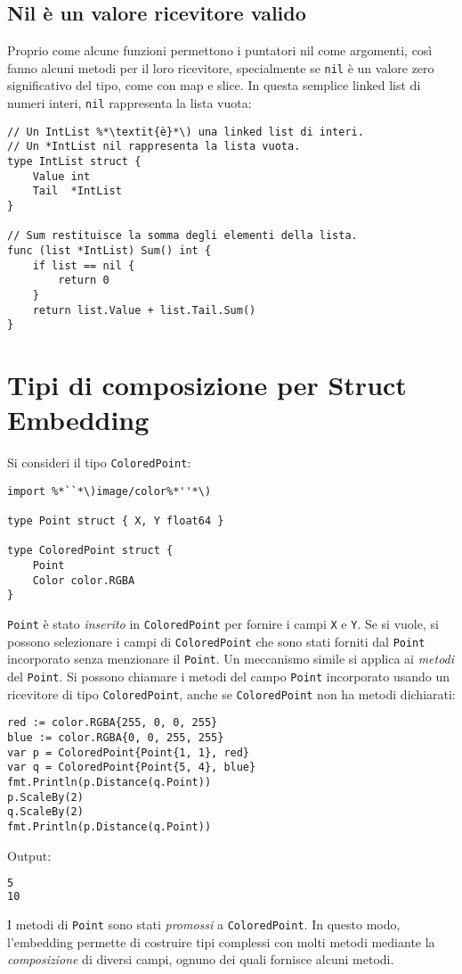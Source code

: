 \subsection{Nil è un valore ricevitore valido}
\label{subsec:nil_e_un_valore_ricevitore_valido}%
Proprio come alcune funzioni permettono i puntatori nil come argomenti, così fanno alcuni metodi per il loro ricevitore, specialmente se \verb|nil| è un valore zero significativo del tipo, come con map e slice.
In questa semplice linked list di numeri interi, \verb|nil| rappresenta la lista vuota:
\begin{lstlisting}[frame=single, label={lst:lstlisting5-2.8}]
// Un IntList %*\textit{è}*\) una linked list di interi.
// Un *IntList nil rappresenta la lista vuota.
type IntList struct {
    Value int
    Tail  *IntList
}

// Sum restituisce la somma degli elementi della lista.
func (list *IntList) Sum() int {
    if list == nil {
        return 0
    }
    return list.Value + list.Tail.Sum()
}
\end{lstlisting}


\section{Tipi di composizione per Struct Embedding}
\label{sec:tipi_di_composizione_per_struct_embedding}%
Si consideri il tipo \verb|ColoredPoint|:
\begin{lstlisting}[frame=single, label={lst:lstlisting5-3.1}]
import %*``*\)image/color%*''*\)

type Point struct { X, Y float64 }

type ColoredPoint struct {
    Point
    Color color.RGBA
}
\end{lstlisting}
\verb|Point| è stato \textit{inserito} in \verb|ColoredPoint| per fornire i campi \verb|X| e \verb|Y|.
Se si vuole, si possono selezionare i campi di \verb|ColoredPoint| che sono stati forniti dal \verb|Point| incorporato senza menzionare il \verb|Point|.
Un meccanismo simile si applica ai \textit{metodi} del \verb|Point|.
Si possono chiamare i metodi del campo \verb|Point| incorporato usando un ricevitore di tipo \verb|ColoredPoint|, anche se \verb|ColoredPoint| non ha metodi dichiarati:
\begin{lstlisting}[frame=single, label={lst:lstlisting5-3.2}]
red := color.RGBA{255, 0, 0, 255}
blue := color.RGBA{0, 0, 255, 255}
var p = ColoredPoint{Point{1, 1}, red}
var q = ColoredPoint{Point{5, 4}, blue}
fmt.Println(p.Distance(q.Point))
p.ScaleBy(2)
q.ScaleBy(2)
fmt.Println(p.Distance(q.Point))
\end{lstlisting}
Output:
\begin{lstlisting}[language=bash, frame=L, label={lst:lstlisting5-3.3}]
5
10
\end{lstlisting}
I metodi di \verb|Point| sono stati \textit{promossi} a \verb|ColoredPoint|.
In questo modo, l'embedding permette di costruire tipi complessi con molti metodi mediante la \textit{composizione} di diversi campi, ognuno dei quali fornisce alcuni metodi.

